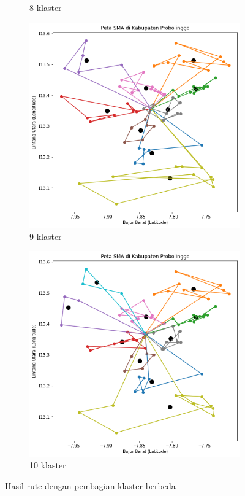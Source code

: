 \begin{figure}[H]
\begin{subfigure}[b]{0.3\textwidth}
		\caption{8 klaster}	
		\label{fig:klasterbeda8}
	\end{subfigure}
	\hfill
	\begin{subfigure}[b]{0.3\textwidth}
		\includegraphics[width=\textwidth]{Gambar/hasil_mtsp/9.png}
		\caption{9 klaster}	
		\label{fig:klasterbeda9}
	\end{subfigure}
	\hfill
	\begin{subfigure}[b]{0.3\textwidth}
		\includegraphics[width=\textwidth]{Gambar/hasil_mtsp/10.png}
		\caption{10 klaster}	
		\label{fig:klasterbeda10}
	\end{subfigure}
	\caption{Hasil rute dengan pembagian klaster berbeda}
	\label{fig:klasterbeda}
\end{figure}